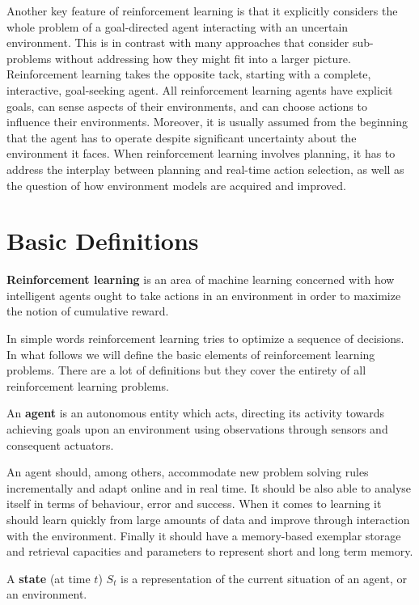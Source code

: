 Another key feature of reinforcement learning is that it explicitly considers the whole problem of a goal-directed 
agent interacting with an uncertain environment. This is in contrast with many approaches that consider sub-problems 
without addressing how they might fit into a larger picture. Reinforcement learning takes the opposite tack, starting
with a complete, interactive, goal-seeking agent. All reinforcement learning agents have explicit goals, can sense
aspects of their environments, and can choose actions to influence their environments. Moreover, it is usually 
assumed from the beginning that the agent has to operate despite significant uncertainty about the environment it 
faces. When reinforcement learning involves planning, it has to address the interplay between planning and real-time 
action selection, as well as the question of how environment models are acquired and improved.

\section{Basic Definitions}

\textbf{Reinforcement learning} is an area of machine learning concerned with how intelligent agents ought to take 
actions in an environment in order to maximize the notion of cumulative reward. 
\ed

In simple words reinforcement learning tries to optimize a sequence of decisions. In what follows we will define the 
basic elements of reinforcement learning problems. There are a lot of definitions but they cover the entirety of all 
reinforcement learning problems.

\bd[Agent]
An \textbf{agent} is an autonomous entity which acts, directing its activity towards achieving goals upon an 
environment using observations through sensors and consequent actuators. 
\ed

An agent should, among others, accommodate new problem solving rules incrementally and adapt online and in real 
time. It should be also able to analyse itself in terms of behaviour, error and success. When it comes to learning 
it should learn quickly from large amounts of data and improve through interaction with the environment. Finally it 
should have a memory-based exemplar storage and retrieval capacities and parameters to represent short and long term 
memory.

\bd[State]
A \textbf{state} (at time $t$) $S_t$ is a representation of the current situation of an agent, or an environment.
\ed


